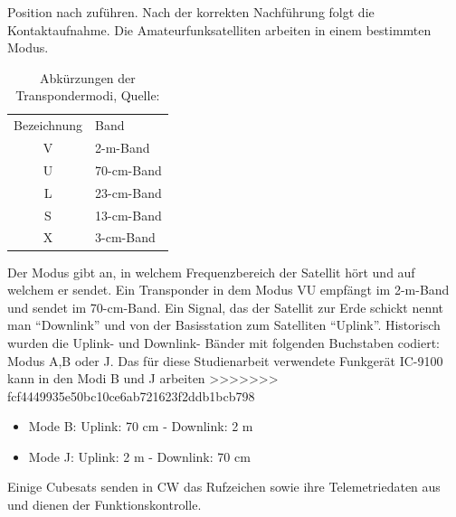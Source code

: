 Position nach zuführen. Nach der korrekten Nachführung folgt die Kontaktaufnahme. Die 
Amateurfunksatelliten arbeiten in einem bestimmten Modus. 
\begin{table}[h]
	\centering
	\caption[Abkürzungen der Transpondermodi]{Abkürzungen der Transpondermodi, Quelle: \cite{amateursat}}
	\begin{tabular}{c|l}
		Bezeichnung & Band\\ 
		V & 2-m-Band 	\\
		U & 70-cm-Band 	\\
		L & 23-cm-Band 	\\
		S & 13-cm-Band 	\\
		X & 3-cm-Band 	\\
	\end{tabular} 
	\label{tab:modi}
\end{table}
\clearpage
Der Modus gibt an, in welchem Frequenzbereich der Satellit hört und auf welchem er sendet. Ein Transponder in dem 
Modus VU empfängt im 2-m-Band und sendet im 70-cm-Band. Ein Signal, das der Satellit zur Erde schickt nennt man ``Downlink'' und von der Basisstation 
zum Satelliten ``Uplink''.
Historisch wurden die Uplink- und Downlink- Bänder mit folgenden Buchstaben codiert: Modus A,B oder J.
Das für diese Studienarbeit verwendete Funkgerät IC-9100 kann in den Modi B und J arbeiten \cite[S.153]{radiomanual}
>>>>>>> fcf4449935e50bc10ce6ab721623f2ddb1bcb798
\begin{itemize}
 \item Mode B: Uplink: 70 cm - Downlink:  2  m 
 \item Mode J: Uplink:  2  m - Downlink: 70 cm
\end{itemize}
Einige Cubesats senden in \ac{CW} das Rufzeichen sowie ihre Telemetriedaten aus und dienen der Funktionskontrolle.

